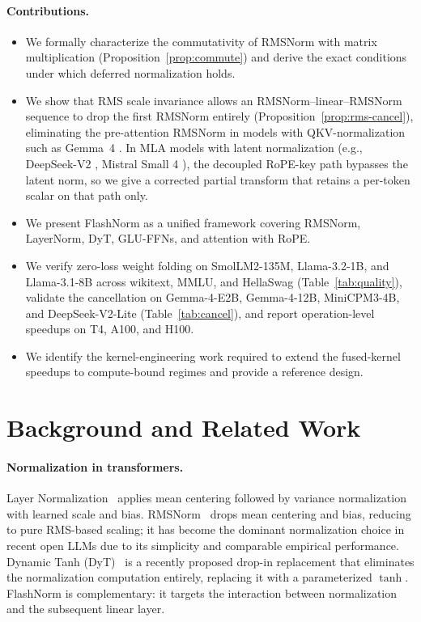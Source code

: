 \documentclass{article}
\begin{document}
\paragraph{Contributions.}
\begin{itemize}
  \item We formally characterize the commutativity of RMSNorm with
        matrix multiplication (Proposition~\ref{prop:commute}) and derive
        the exact conditions under which deferred normalization holds.
  \item We show that RMS scale invariance allows an RMSNorm--linear--RMSNorm
        sequence to drop the first RMSNorm entirely (Proposition~\ref{prop:rms-cancel}),
        eliminating the pre-attention RMSNorm in models with QKV-normalization \citep{qkv-norm}
        such as Gemma~4 \citep{gemma4}. In MLA models with latent normalization
        (e.g., DeepSeek-V2 \citep{deepseek-v2}, Mistral Small 4 \citep{mistral4}),
        the decoupled RoPE-key path bypasses the latent norm, so we give a corrected
        partial transform that retains a per-token scalar on that path only.
  \item We present FlashNorm as a unified framework covering RMSNorm, LayerNorm,
        DyT, GLU-FFNs, and attention with RoPE.
  \item We verify zero-loss weight folding on SmolLM2-135M, Llama-3.2-1B, and
        Llama-3.1-8B across wikitext, MMLU, and HellaSwag (Table~\ref{tab:quality}),
        validate the cancellation on Gemma-4-E2B, Gemma-4-12B, MiniCPM3-4B, and
        DeepSeek-V2-Lite (Table~\ref{tab:cancel}), and report operation-level
        speedups on T4, A100, and H100.
  \item We identify the kernel-engineering work required to extend the fused-kernel
        speedups to compute-bound regimes and provide a reference design.
\end{itemize}

\section{Background and Related Work}

\paragraph{Normalization in transformers.}
Layer Normalization~\citep{layerNorm} applies mean centering followed by
variance normalization with learned scale and bias. RMSNorm~\citep{rms}
drops mean centering and bias, reducing to pure RMS-based scaling; it has become the
dominant normalization choice in recent open LLMs due to its simplicity and
comparable empirical performance. Dynamic Tanh (DyT)~\citep{DyT} is a
recently proposed drop-in replacement that eliminates the normalization computation
entirely, replacing it with a parameterized $\tanh$. FlashNorm is complementary:
it targets the interaction between normalization and the subsequent linear layer.
\end{document}
